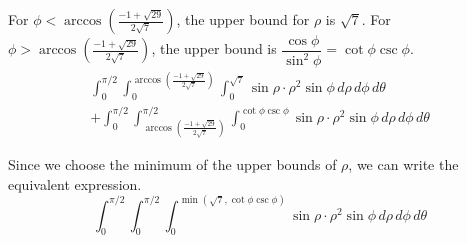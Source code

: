 \documentclass[a4paper, 12pt]{article}
\begin{document}
\begin{enumerate}[leftmargin=*,label=\textbf{\arabic*.}]
For $\phi<\arccos\left(\frac{-1+\sqrt{29}}{2\sqrt7}\right)$, the upper bound for $\rho$ is $\sqrt7$. For $\phi>\arccos\left(\frac{-1+\sqrt{29}}{2\sqrt7}\right)$, the upper bound is $\dfrac{\cos\phi}{\sin^2\phi}=\cot\phi\csc\phi$.
\[\boxed{\begin{array}{l}\displaystyle\int_0^{\pi/2}\int_0^{\arccos\left(\textstyle\frac{-1+\sqrt{29}}{2\sqrt7}\right)}\int_0^{\sqrt7}\sin\rho \cdot\rho^2\sin\phi\,d\rho\,d\phi\,d\theta\\[1em]\displaystyle+\int_0^{\pi/2}\int_{\arccos\left(\textstyle\frac{-1+\sqrt{29}}{2\sqrt7}\right)}^{\pi/2}\int_0^{\cot\phi\csc\phi}\sin\rho\cdot\rho^2\sin\phi\,d\rho\,d\phi\,d\theta\end{array}}\]

Since we choose the minimum of the upper bounds of $\rho$, we can write the equivalent expression.
\[\boxed{\int_0^{\pi/2}\int_0^{\pi/2}\int_0^{\min\left(\sqrt7,\cot\phi\csc\phi\right)}\sin\rho\cdot\rho^2\sin\phi\,d\rho\,d\phi\,d\theta}\]

\end{enumerate}
\end{document}
